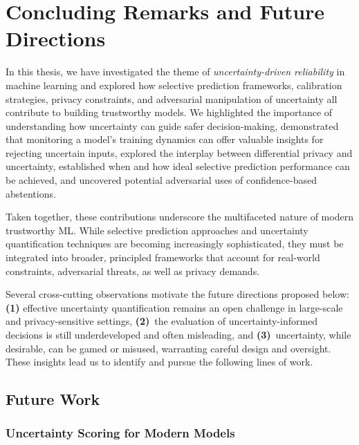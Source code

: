 \chapter{Concluding Remarks and Future Directions}
\label{ch:conclusion}

In this thesis, we have investigated the theme of \emph{uncertainty-driven reliability} in machine learning and explored how selective prediction frameworks, calibration strategies, privacy constraints, and adversarial manipulation of uncertainty all contribute to building trustworthy models. We highlighted the importance of understanding how uncertainty can guide safer decision-making, demonstrated that monitoring a model’s training dynamics can offer valuable insights for rejecting uncertain inputs, explored the interplay between differential privacy and uncertainty, established when and how ideal selective prediction performance can be achieved, and uncovered potential adversarial uses of confidence-based abstentions.

Taken together, these contributions underscore the multifaceted nature of modern trustworthy ML. While selective prediction approaches and uncertainty quantification techniques are becoming increasingly sophisticated, they must be integrated into broader, principled frameworks that account for real-world constraints, adversarial threats, as well as privacy demands. 

Several cross-cutting observations motivate the future directions proposed below: \textbf{(1)} effective uncertainty quantification remains an open challenge in large-scale and privacy-sensitive settings, \textbf{(2)}~the evaluation of uncertainty-informed decisions is still underdeveloped and often misleading, and \textbf{(3)}~uncertainty, while desirable, can be gamed or misused, warranting careful design and oversight. These insights lead us to identify and pursue the following lines of work.

\section{Future Work}

\subsection{Uncertainty Scoring for Modern Models}

